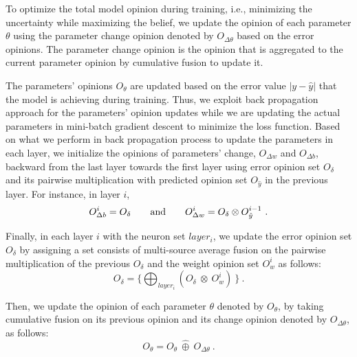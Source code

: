{\color{blue}To optimize the total model opinion during training, i.e., minimizing the uncertainty while maximizing the belief, we update the opinion of each parameter $\theta$ using the parameter change opinion denoted by $O_{\Delta \theta}$ based on the error opinions. The parameter change opinion is the opinion that is aggregated to the current parameter opinion by cumulative fusion to update it.

The parameters' opinions $O_\theta$ are updated based on the error value $|y-\hat{y}|$ that the model is achieving during training. Thus, we exploit back propagation approach for the parameters' opinion updates while we are updating the actual parameters in mini-batch gradient descent to minimize the loss function. Based on what we perform in back propagation process to update the parameters in each layer, we initialize the opinions of parameters' change, $O_{\Delta w}$ and $O_{\Delta b}$, backward from the last layer towards the first layer using error opinion set $O_{\delta}$ and its pairwise multiplication with predicted opinion set $O_{\hat{y}}$ in the previous layer. For instance, in layer $i$,
\begin{equation}
    O_{\Delta b}^i = O_{\delta} \qquad \textnormal{and} \qquad O_{\Delta w}^i = O_{\delta} \otimes O_{\hat{y}}^{i-1}\ .
\end{equation}

Finally, in each layer $i$ with the neuron set $layer_i$, we update the error opinion set $O_{\delta}$ by assigning a set consists of multi-source average fusion on the pairwise multiplication of the previous $O_{\delta}$ and the weight opinion set $O_{w}^i$ as follows:
\begin{equation}
    O_{\delta} = \{ \bigoplus_{layer_i}(O_{\delta}\ \otimes\ O_{w}^i)\ \}\ .
\end{equation}

Then, we update the opinion of each parameter $\theta$ denoted by $O_{\theta}$, by taking cumulative fusion on its previous opinion and its change opinion denoted by $O_{\Delta \theta}$, as follows:
\begin{equation}
    O_{\theta} = O_{\theta}\ \widehat{\oplus}\ O_{\Delta \theta}\ .
\end{equation}
}


